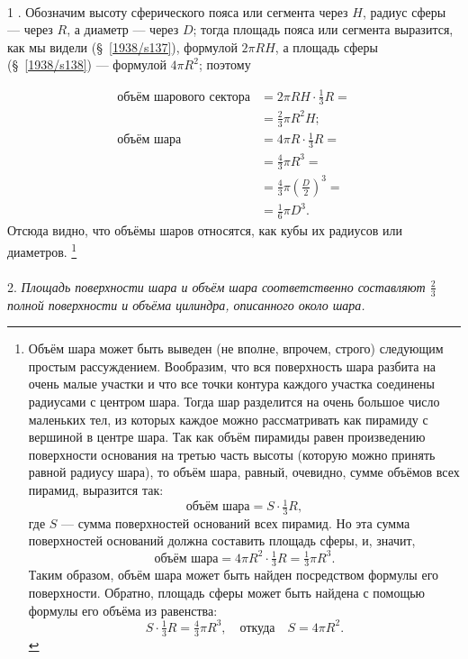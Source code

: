 \paragraph{}\label{1938/s145}
 1 .
Обозначим высоту сферического пояса или сегмента через $H$, радиус сферы — через $R$, а диаметр — через $D$;
тогда площадь пояса или сегмента выразится, как мы видели (§~\ref{1938/s137}), формулой $2\pi RH$, а площадь сферы (§~\ref{1938/s138}) — формулой $4\pi R^2$;
поэтому

\begin{align*}
\text{объём шарового сектора}&= 2\pi RH\cdot \tfrac13 R =
\\
&= \tfrac23 \pi R^2 H;
\\
\text{объём шара} &= 4\pi R\cdot \tfrac13 R = 
\\
&=\tfrac43\pi R^3=
\\
&= \tfrac43\pi\left(\frac D2\right)^3=
\\
&= \tfrac16\pi D^3.
\end{align*}
Отсюда видно, что объёмы шаров относятся, как кубы их радиусов или диаметров.%
\footnote{Объём шара может быть выведен (не вполне, впрочем, строго) следующим простым рассуждением.
Вообразим, что вся поверхность шара разбита на очень малые участки и что все точки контура каждого участка соединены радиусами с центром шара.
Тогда шар разделится на очень большое число маленьких тел, из которых каждое можно рассматривать как пирамиду с вершиной в центре шара.
Так как объём пирамиды равен произведению поверхности основания на третью часть высоты (которую можно принять равной радиусу шара), то объём шара, равный, очевидно, сумме объёмов всех пирамид, выразится так:
\[\text{объём шара} = S \cdot \tfrac13 R,\]
где $S$ — сумма поверхностей оснований всех пирамид.
Но эта сумма поверхностей оснований должна составить площадь сферы, и, значит,
\[\text{объём шара} = 4\pi R^2\cdot \tfrac13 R = \tfrac13 \pi R^3.\]
Таким образом, объём шара может быть найден посредством формулы его поверхности.
Обратно, площадь сферы может быть найдена с помощью формулы его объёма из равенства:
\[S\cdot \tfrac13 R = \tfrac43 \pi R^3,\quad\text{откуда}\quad S = 4\pi R^2.\]
}

\paragraph{}\label{1938/s146}
 2.
\emph{Площадь поверхности шара и объём шара соответственно составляют $\tfrac23$ полной поверхности и объёма цилиндра, описанного около шара.}

